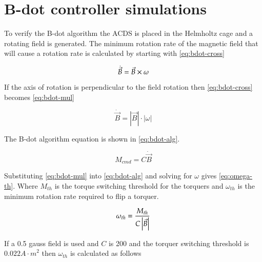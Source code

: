 \begin{comment}
X-axis errors:
    Y+ RMS error = 0.018473
    Y- RMS error = 0.007671
    Z+ RMS error = 0.013049
Total X-axis error = 0.007594

Y-axis errors:
    Z+ RMS error = 0.010704
Total Y-axis error = 0.010704

Z-axis errors:
    Y+ RMS error = 0.011453
    Y- RMS error = 0.009875
Total Z-axis error = 0.006483
\end{comment}

\section{B-dot controller simulations}

To verify the B-dot algorithm the \ac{ACDS} is placed in the Helmholtz cage and a rotating field is generated. The minimum rotation rate of the magnetic field that will cause a rotation rate is calculated by starting with \cref{eq:bdot-cross}

\begin{equation}
    \dot{\vec{B}} = \vec{B} \times \omega
    \label{eq:bdot-cross}
\end{equation}

If the axis of rotation is perpendicular to the field rotation then \cref{eq:bdot-cross} becomes \cref{eq:bdot-mul}

\begin{equation}
    \dot{\vec{B}} = \left| \vec{B} \right| \cdot \left| \omega \right|
    \label{eq:bdot-mul}
\end{equation}

The B-dot algorithm equation is shown in \cref{eq:bdot-alg}.

\begin{equation}
    M_{cmd} = C \dot{\vec{B}} 
    \label{eq:bdot-alg}
\end{equation}

Substituting \cref{eq:bdot-mul} into \cref{eq:bdot-alg} and solving for $\omega$ gives \cref{eq:omega-th}. Where $M_{th}$ is the torque switching threshold for the torquers and $\omega_{th}$ is the minimum rotation rate required to flip a torquer.

\begin{equation}
    \omega _ {th} = {M _ {th} \over{ {C \left| \vec{B} \right|}}}
    \label{eq:omega-th}
\end{equation}

If a 0.5 gauss field is used and $C$ is 200 and the torquer switching threshold is $0.022 \unit{A \cdot m} ^2$ then $\omega_{th}$ is calculated as follows

